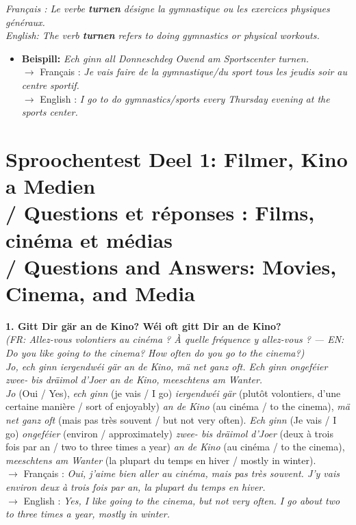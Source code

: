 \noindent\textit{Français : Le verbe \textbf{turnen} désigne la gymnastique ou les exercices physiques généraux.}\\
\textit{English: The verb \textbf{turnen} refers to doing gymnastics or physical workouts.}

\begin{itemize}
    \item \textbf{Beispill:} \textit{Ech ginn all Donneschdeg Owend am Sportscenter turnen.}\\
    $\rightarrow$ Français : \textit{Je vais faire de la gymnastique/du sport tous les jeudis soir au centre sportif.}\\
    $\rightarrow$ English : \textit{I go to do gymnastics/sports every Thursday evening at the sports center.}
\end{itemize}

\vspace{1.5em}

\section[Sproochentest Deel 1: Filmer, Kino a Medien / Q\&A]{Sproochentest Deel 1: Filmer, Kino a Medien \\/ Questions et réponses : Films, cinéma et médias \\/ Questions and Answers: Movies, Cinema, and Media}

\noindent\textbf{1. Gitt Dir gär an de Kino? Wéi oft gitt Dir an de Kino?}\\
\textit{(FR: Allez-vous volontiers au cinéma ? À quelle fréquence y allez-vous ? — EN: Do you like going to the cinema? How often do you go to the cinema?)}\\[0.3em]
\textit{Jo, ech ginn iergendwéi gär an de Kino, mä net ganz oft. Ech ginn ongeféier zwee- bis dräimol d'Joer an de Kino, meeschtens am Wanter.}\\
\textit{Jo} (Oui / Yes), \textit{ech ginn} (je vais / I go) \textit{iergendwéi gär} (plutôt volontiers, d'une certaine manière / sort of enjoyably) \textit{an de Kino} (au cinéma / to the cinema), \textit{mä net ganz oft} (mais pas très souvent / but not very often). \textit{Ech ginn} (Je vais / I go) \textit{ongeféier} (environ / approximately) \textit{zwee- bis dräimol d'Joer} (deux à trois fois par an / two to three times a year) \textit{an de Kino} (au cinéma / to the cinema), \textit{meeschtens am Wanter} (la plupart du temps en hiver / mostly in winter).\\
$\rightarrow$ Français : \textit{Oui, j'aime bien aller au cinéma, mais pas très souvent. J'y vais environ deux à trois fois par an, la plupart du temps en hiver.}\\
$\rightarrow$ English : \textit{Yes, I like going to the cinema, but not very often. I go about two to three times a year, mostly in winter.}\\[0.8em]

